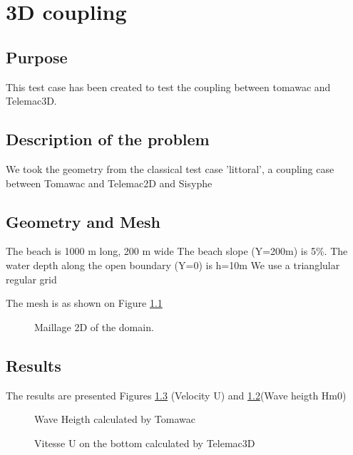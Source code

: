 \chapter{3D coupling}
%
%
\section{Purpose}
%
This test case has been created to test the coupling between tomawac and Telemac3D.

%
\section{Description of the problem}
We took the geometry from the classical test case 'littoral', a coupling case between Tomawac and Telemac2D and Sisyphe
\section{Geometry and Mesh}
%
The beach is 1000 m long, 200 m wide
 The beach slope (Y=200m) is 5\%.
 The water depth along the open boundary (Y=0) is h=10m
We use a trianglular regular grid 

The mesh is as shown on Figure \ref{3Dcouplingmesh}
\begin{figure} [!h]
\centering
{}
 \caption{Maillage 2D of the domain.}
\label{3Dcouplingmesh}
\end{figure}

\section{Results}
The results are presented Figures \ref{figres3Dcoupl2} (Velocity U) and \ref{figres3Dcoupl}(Wave heigth Hm0)

\begin{figure} [!h]
\centering
{}
 \caption{Wave Heigth calculated by Tomawac}
\label{figres3Dcoupl}
\end{figure}

\begin{figure} [!h]
\centering
{}
 \caption{Vitesse U on the bottom calculated by Telemac3D}
\label{figres3Dcoupl2}
\end{figure}

